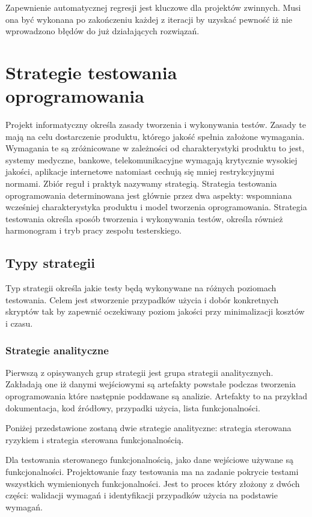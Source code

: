 Zapewnienie automatycznej regresji jest kluczowe dla projektów zwinnych. Musi ona być wykonana po zakończeniu każdej z iteracji by uzyskać pewność iż nie wprowadzono błędów do już działających rozwiązań.

\section{Strategie testowania oprogramowania}
\label{cha:strategie testowania}
Projekt informatyczny określa zasady tworzenia i wykonywania testów. Zasady te mają na celu dostarczenie produktu, którego jakość spełnia założone wymagania. Wymagania te są zróżnicowane w zależności od charakterystyki produktu to jest, systemy medyczne, bankowe, telekomunikacyjne wymagają krytycznie wysokiej jakości, aplikacje internetowe natomiast cechują się mniej restrykcyjnymi normami. Zbiór reguł i praktyk nazywamy strategią. Strategia testowania oprogramowania determinowana jest głównie przez dwa aspekty: wspomniana wcześniej charakterystyka produktu i model tworzenia oprogramowania. 
Strategia testowania określa sposób tworzenia i wykonywania testów, określa również harmonogram i tryb pracy zespołu testerskiego.


\subsection{Typy strategii}
Typ strategii określa jakie testy będą wykonywane na różnych poziomach testowania. Celem jest stworzenie przypadków użycia i dobór konkretnych skryptów tak by zapewnić oczekiwany poziom jakości przy minimalizacji kosztów i czasu.
\subsubsection{Strategie analityczne}
Pierwszą z opisywanych grup strategii jest grupa strategii analitycznych. Zakładają one iż danymi wejściowymi są artefakty powstałe podczas tworzenia oprogramowania które następnie poddawane są analizie. Artefakty to na przykład dokumentacja, kod źródłowy, przypadki użycia, lista funkcjonalności.

Poniżej przedstawione zostaną dwie strategie analityczne: strategia sterowana ryzykiem i strategia sterowana funkcjonalnością. 

Dla testowania sterowanego funkcjonalnością, jako dane wejściowe używane są funkcjonalności. Projektowanie fazy testowania ma na zadanie pokrycie testami wszystkich wymienionych funkcjonalności. Jest to proces który złożony z dwóch części: walidacji wymagań i identyfikacji przypadków użycia na podstawie wymagań. 

